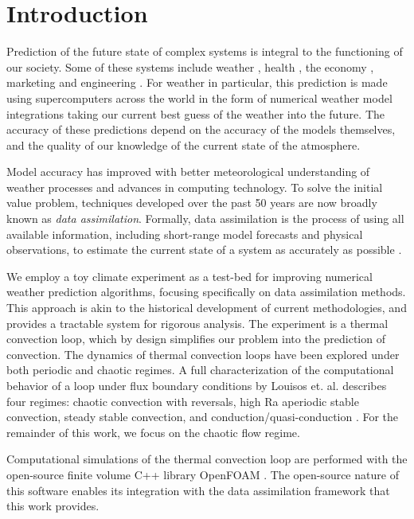 \section{Introduction}

Prediction of the future state of complex systems is integral to the functioning of our society.
Some of these systems include weather \cite{weather-violence2013}, health \cite{ginsberg2008detecting}, the economy \cite{sornette2006predictability}, marketing \cite{asur2010predicting} and engineering \cite{savely1972}.
For weather in particular, this prediction is made using supercomputers across the world in the form of numerical weather model integrations taking our current best guess of the weather into the future.
The accuracy of these predictions depend on the accuracy of the models themselves, and the quality of our knowledge of the current state of the atmosphere.

Model accuracy has improved with better meteorological understanding of weather processes and advances in computing technology.
To solve the initial value problem, techniques developed over the past 50 years are now broadly known as {\em data assimilation}.
Formally, data assimilation is the process of using all available information, including short-range model forecasts and physical observations, to estimate the current state of a system as accurately as possible \cite{yang2006}.

We employ a toy climate experiment as a test-bed for improving numerical weather prediction algorithms, focusing specifically on data assimilation methods.
This approach is akin to the historical development of current methodologies, and provides a tractable system for rigorous analysis.
The experiment is a thermal convection loop, which by design simplifies our problem into the prediction of convection.
The dynamics of thermal convection loops have been explored under both periodic \cite{keller1966} and chaotic \cite{welander1967,creveling1975stability,gorman1984,gorman1986,ehrhard1990dynamical,yuen1999,jiang2003,burroughs2005reduced,desrayaud2006numerical,yang2006,ridouane2010} regimes.
A full characterization of the computational behavior of a loop under flux boundary conditions by Louisos et. al. describes four regimes: chaotic convection with reversals, high Ra aperiodic stable convection, steady stable convection, and conduction/quasi-conduction \cite{louisos2013}.
For the remainder of this work, we focus on the chaotic flow regime.

Computational simulations of the thermal convection loop are performed with the open-source finite volume C++ library OpenFOAM \cite{jasak2007}.
The open-source nature of this software enables its integration with the data assimilation framework that this work provides.

